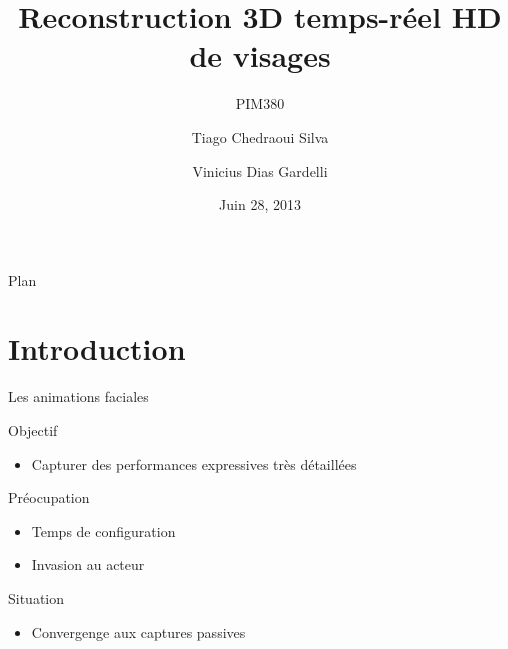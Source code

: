 \documentclass[compress,pdf,11pt,xcolor=dvipsnames]{beamer}
\title{Reconstruction 3D temps-réel HD de visages}
\subtitle{PIM380}
\author[Tiago Siva, Vinicius Gardelli]{
  Tiago Chedraoui Silva \and
  Vinicius Dias Gardelli\\
}
\institute{Télécom Paristech}
\date{Juin 28, 2013}
\begin{document}
\begin{frame}
  \titlepage
\end{frame}

\begin{frame}{Plan}
  \tableofcontents
\end{frame}

\section{Introduction}

\begin{frame}{Les animations faciales}

        \begin{block}{Objectif}
          \begin{itemize}
          \item Capturer des performances expressives très
          détaillées
          \end{itemize}
        \end{block}

        \begin{alertblock}{Préocupation}
          \begin{itemize}
          \item Temps de configuration 
          \item Invasion au acteur 
          \end{itemize}
        \end{alertblock}

        \begin{exampleblock}{Situation}
          \begin{itemize}
          \item Convergenge aux captures passives
          \end{itemize}
        \end{exampleblock}


      

\end{frame}
\end{document}
